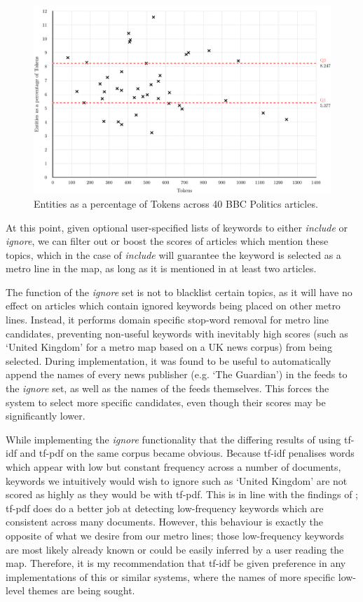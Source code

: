 \begin{figure}[htbp!]
	\centering
	\includegraphics[width=\textwidth]{img/implementation/TokensEntities.pdf}
	\caption{Entities as a percentage of Tokens across 40 BBC Politics articles.}
	\label{fig:tokensentities}
\end{figure}

At this point, given optional user-specified lists of keywords to either \textit{include} or \textit{ignore}, we can filter out or boost the scores of articles which mention these topics, which in the case of \textit{include} will guarantee the keyword is selected as a metro line in the map, as long as it is mentioned in at least two articles. 

The function of the \textit{ignore} set is not to blacklist certain topics, as it will have no effect on articles which contain ignored keywords being placed on other metro lines. Instead, it performs domain specific stop-word removal for metro line candidates, preventing non-useful keywords with inevitably high scores (such as `United Kingdom' for a metro map based on a UK news corpus) from being selected. During implementation, it was found to be useful to automatically append the names of every news publisher (e.g. `The Guardian') in the feeds to the \textit{ignore} set, as well as the names of the feeds themselves. This forces the system to select more specific candidates, even though their scores may be significantly lower.

While implementing the \textit{ignore} functionality that the differing results of using tf-idf and tf-pdf on the same corpus became obvious. Because tf-idf penalises words which appear with low but constant frequency across a number of documents, keywords we intuitively would wish to ignore such as `United Kingdom' are not scored as highly as they would be with tf-pdf. This is in line with the findings of \citeauthor{TopicExtractionfromnewsArchiveUsingTFPDFAlgorithm}; tf-pdf does do a better job at detecting low-frequency keywords which are consistent across many documents. However, this behaviour is exactly the opposite of what we desire from our metro lines; those low-frequency keywords are most likely already known or could be easily inferred by a user reading the map. Therefore, it is my recommendation that tf-idf be given preference in any implementations of this or similar systems, where the names of more specific low-level themes are being sought.

